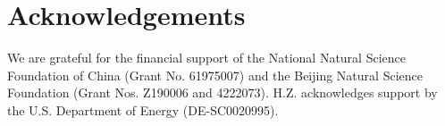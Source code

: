 \documentclass[twoside,twocolumn,9pt]{article}
\renewcommand{\refname}{Notes and references}
\begin{document}
\section*{Acknowledgements}
We are grateful for the financial support of the National Natural Science Foundation of China (Grant No. 61975007) and the Beijing Natural Science Foundation (Grant Nos. Z190006 and 4222073). H.Z. acknowledges support by the U.S. Department of Energy (DE-SC0020995). 



\balance


\end{document}
